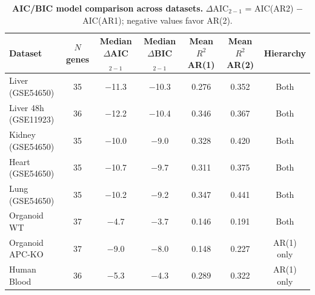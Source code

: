 \documentclass[11pt,a4paper]{article}
\begin{document}
\begin{table}[H]
\centering
\caption{\textbf{AIC/BIC model comparison across datasets.} $\Delta$AIC$_{2-1}$ = AIC(AR2) $-$ AIC(AR1); negative values favor AR(2).}
\label{tab:aic_comparison}
\begin{tabular}{lcccccc}
\toprule
\textbf{Dataset} & \textbf{$N$ genes} & \textbf{Median $\Delta$AIC$_{2-1}$} & \textbf{Median $\Delta$BIC$_{2-1}$} & \textbf{Mean $R^2$ AR(1)} & \textbf{Mean $R^2$ AR(2)} & \textbf{Hierarchy} \\
\midrule
Liver (GSE54650) & 35 & $-$11.3 & $-$10.3 & 0.276 & 0.352 & Both \\
Liver 48h (GSE11923) & 36 & $-$12.2 & $-$10.4 & 0.346 & 0.367 & Both \\
Kidney (GSE54650) & 35 & $-$10.0 & $-$9.0 & 0.328 & 0.420 & Both \\
Heart (GSE54650) & 35 & $-$10.7 & $-$9.7 & 0.311 & 0.375 & Both \\
Lung (GSE54650) & 35 & $-$10.2 & $-$9.2 & 0.347 & 0.441 & Both \\
Organoid WT & 37 & $-$4.7 & $-$3.7 & 0.146 & 0.191 & Both \\
Organoid APC-KO & 37 & $-$9.0 & $-$8.0 & 0.148 & 0.227 & AR(1) only \\
Human Blood & 36 & $-$5.3 & $-$4.3 & 0.289 & 0.322 & AR(1) only \\
\bottomrule
\end{tabular}
\end{table}
\end{document}
